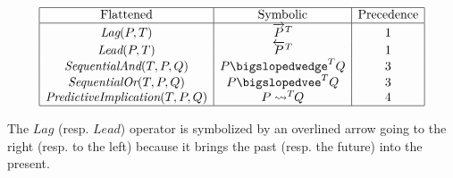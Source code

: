 \documentclass[runningheads]{llncs}
\newcommand{\SP}{\;\;\;}
\newcommand{\TEval}{\textit{Evaluation}}
\newcommand{\TList}{\textit{List}}
\newcommand{\TLamb}{\textit{Lambda}}
\newcommand{\TExec}{\textit{Execution}}
\newcommand{\TAtTime}{\textit{AtTime}}
\newcommand{\TAnd}{\textit{And}}
\newcommand{\TOr}{\textit{Or}}
\newcommand{\TImpl}{\textit{Implication}}
\newcommand{\TPredImpl}{\textit{PredictiveImplication}}
\newcommand{\TSeqAnd}{\textit{SequentialAnd}}
\newcommand{\TSeqOr}{\textit{SequentialOr}}
\newcommand{\TLag}{\textit{Lag}}
\newcommand{\TLead}{\textit{Lead}}
\newcommand{\TTV}{\textit{TV}}
\newcommand{\TBTV}{\langle \TTV \rangle}
\newcommand{\limp}{\rightarrow}
\newcommand{\lpreimp}[1]{\leadsto^{#1}}
\newcommand{\lseqor}[1]{\bigslopedvee^{#1}}
\newcommand{\lseqand}[1]{\bigslopedwedge^{#1}}
\newcommand{\ldo}[1]{\widehat{#1}}
\newcommand{\llag}[2]{\overrightarrow{#1}^{#2}}
\newcommand{\llead}[2]{\overleftarrow{#1}^{#2}}
\begin{document}
\renewcommand{\arraystretch}{1.5}
$$
\begin{array}{|c|c|c|}
  \hline
  \text{Flattened} & \text{Symbolic} & \text{Precedence} \\
  \hline
  \TLag(P, T) & \llag{P}{T} & 1 \\
  \TLead(P, T) & \llead{P}{T} & 1 \\
  \TSeqAnd(T, P, Q) & P \lseqand{T} Q & 3 \\
  \TSeqOr(T, P, Q) & P \lseqor{T} Q & 3 \\
  \TPredImpl(T, P, Q) & P \lpreimp{T} \! \! Q & 4 \\
  \hline
\end{array}
$$
\renewcommand{\arraystretch}{1}

The $\TLag$ (resp. $\TLead$) operator is symbolized by an overlined
arrow going to the right (resp. to the left) because it brings the
past (resp. the future) into the present.




\end{document}
